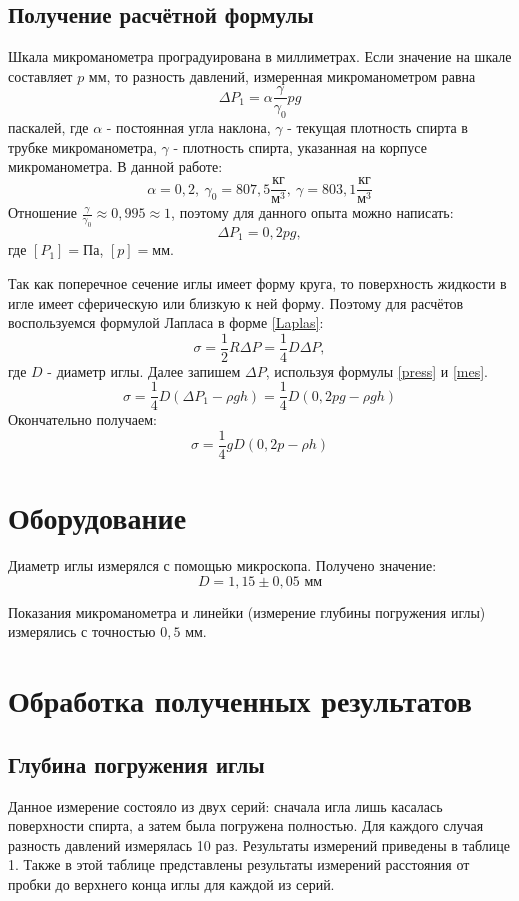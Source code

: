 \documentclass[15pt,a5paper,reqno]{article}
\begin{document}
    \subsection{Получение расчётной формулы} 
    
    Шкала микроманометра проградуирована в миллиметрах. Если значение на шкале составляет $p$ мм, то разность давлений, измеренная микроманометром равна
    \[\Delta P_1 = \alpha\frac{\gamma}{\gamma_0}pg\]
    паскалей, где $\alpha$ - постоянная угла наклона, $\gamma$ - текущая плотность спирта в трубке микроманометра, $\gamma$ - плотность спирта, указанная на корпусе микроманометра. В данной работе:
    \[\alpha = 0,2,\ \gamma_0 = 807,5 \frac{\text{кг}}{\text{м}^3},\ \gamma = 803,1 \frac{\text{кг}}{\text{м}^3}\]
    Отношение $\frac{\gamma}{\gamma_0}\approx 0,995\approx 1$, поэтому для данного опыта можно написать:
    \begin{equation}\label{mes}
        \Delta P_1 = 0,2pg,
    \end{equation}
    где $[P_1] = \text{Па}$, $[p] = \text{мм}$.
    
    Так как поперечное сечение иглы имеет форму круга, то поверхность жидкости в игле имеет сферическую или близкую к ней форму. Поэтому для расчётов воспользуемся формулой Лапласа в форме \eqref{Laplas}:
    \[\sigma = \frac{1}{2}R\Delta P = \frac{1}{4}D\Delta P,\]
    где $D$ - диаметр иглы. Далее запишем $\Delta P$, используя формулы \eqref{press} и \eqref{mes}.
    \[\sigma = \frac{1}{4}D(\Delta P_1 - \rho gh) = \frac{1}{4}D(0,2pg - \rho gh)\]
    Окончательно получаем:
    \begin{equation}\label{tension}
        \boxed{\sigma = \frac{1}{4}gD(0,2p - \rho h)}
    \end{equation}
    
\section{Оборудование}
    Диаметр иглы измерялся с помощью микроскопа. Получено значение:
    \[D = 1,15 \pm 0,05\text{ мм}\]
    
    Показания микроманометра и линейки (измерение глубины погружения иглы) измерялись с точностью $0,5\text{ мм}$. 

\section{Обработка полученных результатов}

    \subsection{Глубина погружения иглы}
    Данное измерение состояло из двух серий: сначала игла лишь касалась поверхности спирта, а затем была погружена полностью. Для каждого случая разность давлений измерялась 10 раз. Результаты измерений приведены в таблице 1. Также в этой таблице представлены результаты измерений расстояния от пробки до верхнего конца иглы для каждой из серий.
    
\end{document}
